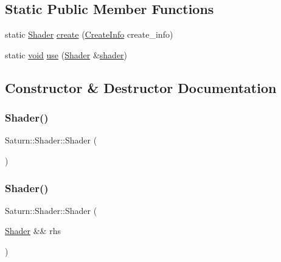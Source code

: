 \subsection*{Static Public Member Functions}
\begin{DoxyCompactItemize}
\item 
static \mbox{\hyperlink{class_saturn_1_1_shader}{Shader}} \mbox{\hyperlink{class_saturn_1_1_shader_abb3c38a9a563aafaaa55b0f5a88b79d0}{create}} (\mbox{\hyperlink{struct_saturn_1_1_shader_1_1_create_info}{Create\+Info}} create\+\_\+info)
\item 
static \mbox{\hyperlink{glad_8h_a950fc91edb4504f62f1c577bf4727c29}{void}} \mbox{\hyperlink{class_saturn_1_1_shader_a9102b4acb66e5338f75de94acd883570}{use}} (\mbox{\hyperlink{class_saturn_1_1_shader}{Shader}} \&\mbox{\hyperlink{glad_8h_a57b2a96adb1d51204909a82d861e395e}{shader}})
\end{DoxyCompactItemize}


\subsection{Constructor \& Destructor Documentation}
\mbox{\label{class_saturn_1_1_shader_ac844565e800b21281d447361e88ccfd6}} 
\subsubsection{\texorpdfstring{Shader()}{Shader()}\hspace{0.1cm}{\footnotesize\ttfamily [1/2]}}
{\footnotesize\ttfamily Saturn\+::\+Shader\+::\+Shader (\begin{DoxyParamCaption}{ }\end{DoxyParamCaption})\hspace{0.3cm}{\ttfamily [default]}}

\mbox{\label{class_saturn_1_1_shader_abecdd4196df24376e4ef6ad16a28a4e0}} 
\subsubsection{\texorpdfstring{Shader()}{Shader()}\hspace{0.1cm}{\footnotesize\ttfamily [2/2]}}
{\footnotesize\ttfamily Saturn\+::\+Shader\+::\+Shader (\begin{DoxyParamCaption}\item[{\mbox{\hyperlink{class_saturn_1_1_shader}{Shader}} \&\&}]{rhs }\end{DoxyParamCaption})}



